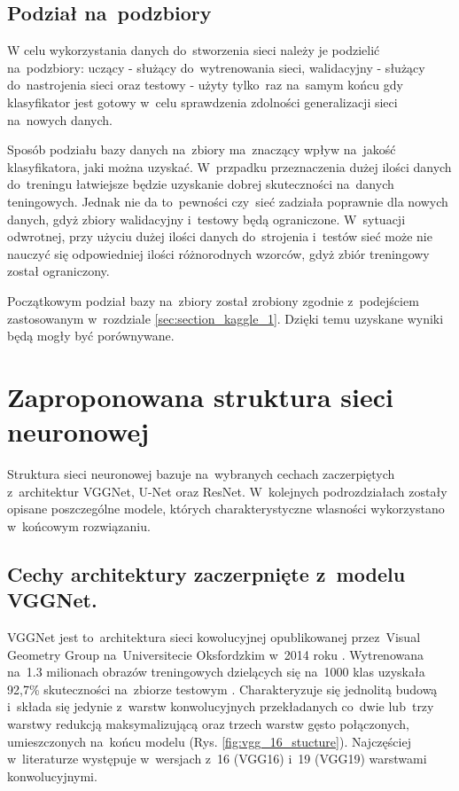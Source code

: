 \subsection{Podział na~podzbiory}

W celu wykorzystania danych do~stworzenia sieci należy je podzielić na~podzbiory: uczący - służący do~wytrenowania sieci, walidacyjny - służący do~nastrojenia sieci oraz testowy - użyty tylko~raz na~samym końcu gdy klasyfikator jest gotowy w~celu sprawdzenia zdolności generalizacji sieci na~nowych danych.

{\parindent0pt
Sposób podziału bazy danych na~zbiory ma~znaczący wpływ na~jakość klasyfikatora, jaki można uzyskać. W~przpadku przeznaczenia dużej ilości danych do~treningu łatwiejsze będzie uzyskanie dobrej skuteczności na~danych teningowych. Jednak nie da to~pewności czy~sieć zadziała poprawnie dla nowych danych, gdyż zbiory walidacyjny i~testowy będą ograniczone. W~sytuacji odwrotnej, przy użyciu dużej ilości danych do~strojenia i~testów sieć może nie nauczyć się odpowiedniej ilości różnorodnych wzorców, gdyż zbiór treningowy został ograniczony.

Początkowym podział bazy na~zbiory został zrobiony zgodnie z~podejściem zastosowanym w~rozdziale \ref{sec:section_kaggle_1}. Dzięki temu uzyskane wyniki będą mogły być porównywane.
}

\section{Zaproponowana struktura sieci neuronowej}
Struktura sieci neuronowej bazuje na~wybranych cechach zaczerpiętych z~architektur VGGNet, U-Net oraz ResNet. W~kolejnych podrozdziałach zostały opisane poszczególne modele, których charakterystyczne wlasności wykorzystano w~końcowym rozwiązaniu.

\subsection{Cechy architektury zaczerpnięte z~modelu VGGNet.}

VGGNet jest to~architektura sieci kowolucyjnej opublikowanej przez~Visual Geometry Group na~Universitecie Oksfordzkim w~2014 roku \cite{VGG16_info}. Wytrenowana na~1.3 milionach obrazów treningowych dzielących się na~1000 klas uzyskała 92,7\% skuteczności na~zbiorze testowym \cite{deep_learning_w_keras}\cite{VGG16_article_online}. Charakteryzuje się jednolitą budową i~składa się jedynie z~warstw konwolucyjnych przekładanych co~dwie lub~trzy warstwy redukcją maksymalizującą oraz trzech warstw gęsto połączonych, umieszczonych na~końcu modelu (Rys. \ref{fig:vgg_16_stucture}). Najczęściej w~literaturze występuje w~wersjach z~16 (VGG16) i~19 (VGG19) warstwami konwolucyjnymi. 

